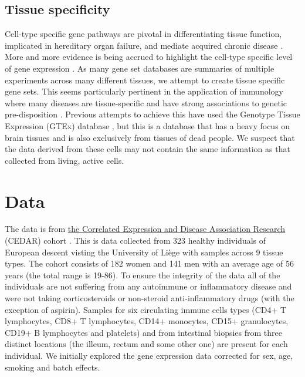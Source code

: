 \documentclass[11pt]{article} %
\begin{document}
	\subsection{Tissue specificity}
	Cell-type specific gene pathways are pivotal in differentiating tissue function, implicated in hereditary organ failure, and mediate acquired chronic disease \cite{ju_defining_2013}. More and more evidence is being accrued to highlight the cell-type specific level of gene expression \cite{grundberg_mapping_2012}\cite{ong_enhancer_2011}\cite{maniatis_regulation_1987}. As many gene set databases are summaries of multiple experiments across many different tissues, we attempt to create tissue specific gene sets. This seems particularly pertinent in the application of immunology where many diseases are tissue-specific and have strong associations to genetic pre-disposition \cite{vyse_genetic_1996}\cite{maas_cutting_2002}\cite{aune_co-localization_2004}\cite{botstein_discovering_2003}. Previous attempts to achieve this have used the Genotype Tissue Expression (GTEx) database \cite{gtex_consortium_genetic_2017}\cite{lonsdale_genotype-tissue_2013}, but this is a database that has a heavy focus on brain tissues and is also exclusively from tissues of dead people. We suspect that the data derived from these cells may not contain the same information as that collected from living, active cells. 

	\section{Data}
	The data is from \href{http://139.165.108.18/srv/genmol/permanent/1be6993fe41c12a051c9244d67c91da2be49e5dd26a6cd79f442bc006971e2ef/crohn-index.html}
	{the Correlated Expression and Disease Association Research} (CEDAR) cohort \cite{the_international_ibd_genetics_consortium_ibd_2018}. This is 
	data collected from 323 healthy individuals of European descent visting the University of Li\`ege with 
	samples across 9 tissue types. The cohort consists of 182 women and 141 men with an average age of 56 
	years (the total range is 19-86). To ensure the integrity of the data all of the individuals are not 
	suffering from any autoimmune or inflammatory disease and were not taking corticosteroids or non-steroid 
	anti-inflammatory drugs (with the exception of aspirin). Samples for six circulating immune cells types
	(CD4+ T lymphocytes, CD8+ T lymphocytes, CD14+ monocytes, CD15+ granulocytes, CD19+ B lymphocytes and 
	platelets) and from intestinal biopsies from three distinct locations (the illeum, rectum and 
	some other one) are present for each individual. We initially explored the gene expression data 
	corrected for sex, age, smoking and batch effects.
	
\end{document}
